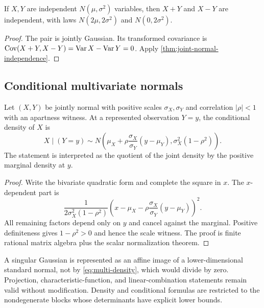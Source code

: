 \begin{corollary}\label{cor:sum-difference}
If $X,Y$ are independent $N(\mu,\sigma^2)$ variables, then $X+Y$ and $X-Y$ are independent, with laws $N(2\mu,2\sigma^2)$ and $N(0,2\sigma^2)$.
\end{corollary}

\begin{proof}
The pair is jointly Gaussian.  Its transformed covariance is
$\operatorname{Cov}(X+Y,X-Y)=\operatorname{Var} X-\operatorname{Var} Y=0$.  Apply \cref{thm:joint-normal-independence}.
\end{proof}

\subsection{Conditional multivariate normals}

\begin{theorem}\label{thm:bivariate-conditional}
Let $(X,Y)$ be jointly normal with positive scales $\sigma_X,\sigma_Y$ and correlation $|\rho|<1$ with an apartness witness.  At a represented observation $Y=y$, the conditional density of $X$ is
\begin{equation}\label{eq:conditional-normal}
 X\mid(Y=y)\sim N\!\left(
 \mu_X+\rho\frac{\sigma_X}{\sigma_Y}(y-\mu_Y),
 \sigma_X^2(1-\rho^2)
 \right).
\end{equation}
The statement is interpreted as the quotient of the joint density by the positive marginal density at $y$.
\end{theorem}

\begin{proof}
Write the bivariate quadratic form and complete the square in $x$.  The $x$-dependent part is
\[
 \frac{1}{2\sigma_X^2(1-\rho^2)}
 \left(x-\mu_X-\rho\frac{\sigma_X}{\sigma_Y}(y-\mu_Y)\right)^2.
\]
All remaining factors depend only on $y$ and cancel against the marginal.  Positive definiteness gives $1-\rho^2>0$ and hence the scale witness.  The proof is finite rational matrix algebra plus the scalar normalization theorem.
\end{proof}

\begin{remark}
A singular Gaussian is represented as an affine image of a lower-dimensional standard normal, not by \eqref{eq:multi-density}, which would divide by zero.  Projection, characteristic-function, and linear-combination statements remain valid without modification.  Density and conditional formulas are restricted to the nondegenerate blocks whose determinants have explicit lower bounds.
\end{remark}
